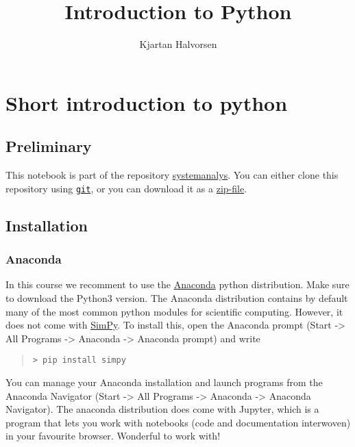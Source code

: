 \documentclass{article}
\title{Introduction to Python}
\author{Kjartan Halvorsen}
\begin{document}
    
    
    \maketitle
    
    

    
    \section{Short introduction to
python}\label{short-introduction-to-python}

\subsection{Preliminary}\label{preliminary}

This notebook is part of the repository
\href{https://github.com/alfkjartan/systemanalys}{systemanalys}. You can
either clone this repository using \href{https://help.github.com/articles/set-up-git/}{\texttt{git}}, or you can download it
as a
\href{https://github.com/alfkjartan/systemanalys/archive/master.zip}{zip-file}.

\subsection{Installation}\label{installation}

\subsubsection{Anaconda}\label{anaconda}

In this course we recomment to use the
\href{https://www.continuum.io/downloads}{Anaconda} python distribution.
Make sure to download the Python3 version. The Anaconda distribution
contains by default many of the most common python modules for
scientific computing. However, it does not come with
\href{https://simpy.readthedocs.io/en/latest/}{SimPy}. To install this,
open the Anaconda prompt (Start -\textgreater{} All Programs
-\textgreater{} Anaconda -\textgreater{} Anaconda prompt) and write

\begin{quote}
\texttt{\textgreater{}\ pip\ install\ simpy}
\end{quote}

You can manage your Anaconda installation and launch programs from the
Anaconda Navigator (Start -\textgreater{} All Programs -\textgreater{}
Anaconda -\textgreater{} Anaconda Navigator). The anaconda distribution
does come with Jupyter, which is a program that lets you work with
notebooks (code and documentation interwoven) in your favourite browser.
Wonderful to work with!
\end{document}
